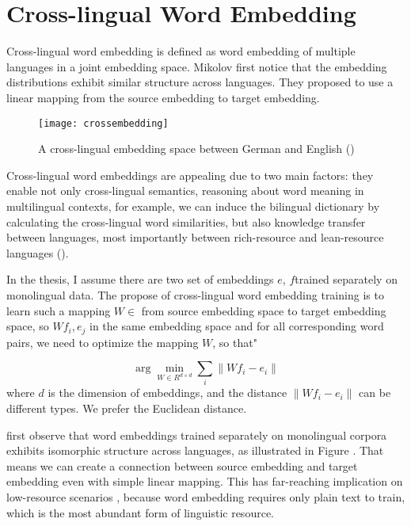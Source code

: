\section{ Cross-lingual Word Embedding}



	Cross-lingual word embedding is defined as word embedding of multiple languages in a joint embedding space. Mikolov first notice that the embedding distributions exhibit similar structure across languages. They proposed to use a linear mapping from the source embedding to target embedding. \\
	\begin{figure}[t]
		\texttt{[image: crossembedding]}
		\centering
		\caption{A cross-lingual embedding space between German and English (\cite{ruder2017survey})}
	\end{figure}
	
	Cross-lingual word embeddings are appealing due to two main factors: they enable not only cross-lingual semantics, reasoning about word meaning in multilingual contexts, for example, we can induce the bilingual dictionary by calculating the cross-lingual word similarities, but also knowledge transfer between languages, most importantly between rich-resource and lean-resource languages (\cite{adams2017cross}). 

	In the thesis, I assume there are two set of embeddings ${e}$, ${f}$trained separately on monolingual data.  The propose of cross-lingual word embedding training is to learn such a mapping ${W \in }$ from source embedding space to target embedding space, so $Wf_i, e_j$ in the same embedding space and for all corresponding word pairs, we need to optimize the mapping ${W}$, so that"
	 
	
	\[ \arg\min_{W \in R^{d \times d}} \sum_{i} \lVert Wf_i - e_i \rVert \]
	where $d$ is the dimension of embeddings, and the distance ${\lVert Wf_i - e_i \rVert}$ can be different types. We prefer the Euclidean distance.  

first observe that word embeddings trained separately on monolingual corpora exhibits isomorphic structure across languages, as illustrated in Figure {}. That means we can create a connection between source embedding and target embedding even with simple linear mapping. This has far-reaching implication on low-resource scenarios {}{}{}, because word embedding requires only plain text to train, which is the most abundant form of linguistic resource.
	

